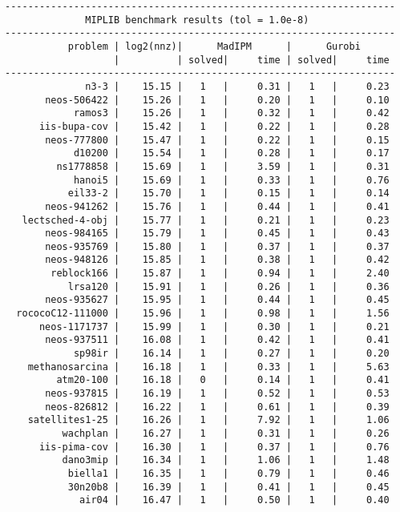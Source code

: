 \begin{verbatim}
--------------------------------------------------------------------
              MIPLIB benchmark results (tol = 1.0e-8)
--------------------------------------------------------------------
           problem | log2(nnz)|      MadIPM      |      Gurobi        
                   |          | solved|     time | solved|     time     
--------------------------------------------------------------------
              n3-3 |    15.15 |   1   |     0.31 |   1   |     0.23
       neos-506422 |    15.26 |   1   |     0.20 |   1   |     0.10
            ramos3 |    15.26 |   1   |     0.32 |   1   |     0.42
      iis-bupa-cov |    15.42 |   1   |     0.22 |   1   |     0.28
       neos-777800 |    15.47 |   1   |     0.22 |   1   |     0.15
            d10200 |    15.54 |   1   |     0.28 |   1   |     0.17
         ns1778858 |    15.69 |   1   |     3.59 |   1   |     0.31
            hanoi5 |    15.69 |   1   |     0.33 |   1   |     0.76
           eil33-2 |    15.70 |   1   |     0.15 |   1   |     0.14
       neos-941262 |    15.76 |   1   |     0.44 |   1   |     0.41
   lectsched-4-obj |    15.77 |   1   |     0.21 |   1   |     0.23
       neos-984165 |    15.79 |   1   |     0.45 |   1   |     0.43
       neos-935769 |    15.80 |   1   |     0.37 |   1   |     0.37
       neos-948126 |    15.85 |   1   |     0.38 |   1   |     0.42
        reblock166 |    15.87 |   1   |     0.94 |   1   |     2.40
           lrsa120 |    15.91 |   1   |     0.26 |   1   |     0.36
       neos-935627 |    15.95 |   1   |     0.44 |   1   |     0.45
  rococoC12-111000 |    15.96 |   1   |     0.98 |   1   |     1.56
      neos-1171737 |    15.99 |   1   |     0.30 |   1   |     0.21
       neos-937511 |    16.08 |   1   |     0.42 |   1   |     0.41
            sp98ir |    16.14 |   1   |     0.27 |   1   |     0.20
    methanosarcina |    16.18 |   1   |     0.33 |   1   |     5.63
         atm20-100 |    16.18 |   0   |     0.14 |   1   |     0.41
       neos-937815 |    16.19 |   1   |     0.52 |   1   |     0.53
       neos-826812 |    16.22 |   1   |     0.61 |   1   |     0.39
    satellites1-25 |    16.26 |   1   |     7.92 |   1   |     1.06
          wachplan |    16.27 |   1   |     0.31 |   1   |     0.26
      iis-pima-cov |    16.30 |   1   |     0.37 |   1   |     0.76
          dano3mip |    16.34 |   1   |     1.06 |   1   |     1.48
           biella1 |    16.35 |   1   |     0.79 |   1   |     0.46
           30n20b8 |    16.39 |   1   |     0.41 |   1   |     0.45
             air04 |    16.47 |   1   |     0.50 |   1   |     0.40

\end{verbatim}
